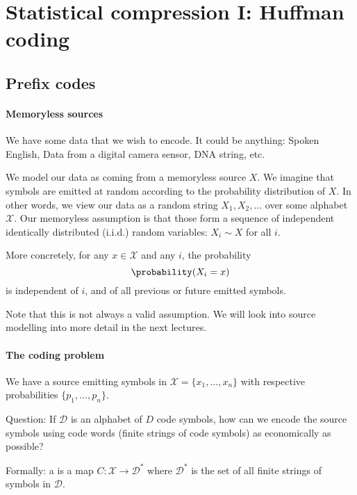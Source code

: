 \section{Statistical compression I: Huffman coding}
\label{sec:01}

\subsection{Prefix codes}

\paragraph{Memoryless sources}

We have some data that we wish to encode. It could be anything: Spoken English, Data from a digital camera sensor, DNA string, etc.

We model our data as coming from a memoryless source $X$. We imagine that symbols are emitted at random according to the probability distribution of $X$. In other words, we view our data as a random string $X_1, X_2, \dots$ over some alphabet $\mathcal{X}$. Our memoryless assumption is that those form a sequence of independent identically distributed (i.i.d.) random variables: $X_i \sim X$ for all $i$.

More concretely, for any $x \in \mathcal{X}$ and any $i$, the probability 
\[
    \probability(X_i = x)
\]
is independent of $i$, and of all previous or future emitted symbols.

Note that this is not always a valid assumption. We will look into source modelling into more detail in the next lectures.



\paragraph{The coding problem}


We have a source emitting symbols in $\mathcal{X} = \{x_1, \dots, x_n\}$ with respective probabilities  $\{p_1, \dots, p_n\}$.


Question: If  $\mathcal{D}$ is an alphabet of  $D$ code symbols, how can we encode the source symbols using code words (finite strings of code symbols) as economically as possible?

Formally: a  is a map $C : \mathcal{X} \to \mathcal{D}^*$
where  $\mathcal{D}^*$     is the set of all finite strings of symbols in  $\mathcal{D}$.

